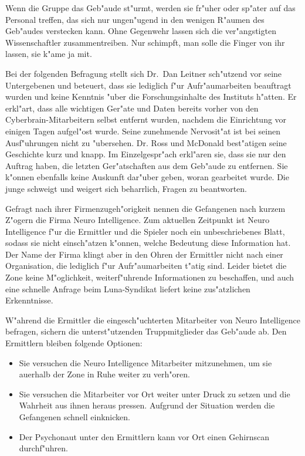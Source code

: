 Wenn die Gruppe das Geb"aude st"urmt, werden sie fr"uher oder sp"ater auf das Personal treffen, das sich nur ungen"ugend in den wenigen R"aumen des Geb"audes verstecken kann. Ohne Gegenwehr lassen sich die ver"angstigten Wissenschaftler zusammentreiben. Nur \ml{} schimpft, man solle die Finger von ihr lassen, sie k"ame ja mit.

Bei der folgenden Befragung stellt sich Dr.~Dan Leitner sch"utzend vor seine Untergebenen und beteuert, dass sie lediglich f"ur Aufr"aumarbeiten beauftragt wurden und keine Kenntnis "uber die Forschungsinhalte des Instituts h"atten. Er erkl"art, dass alle wichtigen Ger"ate und Daten bereits vorher von den Cyberbrain-Mitarbeitern selbst entfernt wurden, nachdem die Einrichtung vor einigen Tagen aufgel"ost wurde. Seine zunehmende Nervosit"at ist bei seinen Ausf"uhrungen nicht zu "ubersehen. Dr. Ross und McDonald best"atigen seine Geschichte kurz und knapp. Im Einzelgespr"ach erkl"aren sie, dass sie nur den Auftrag haben, die letzten Ger"atschaften aus dem Geb"aude zu entfernen. Sie k"onnen ebenfalls keine Auskunft dar"uber geben, woran gearbeitet wurde. Die junge \ml{} schweigt und weigert sich beharrlich, Fragen zu beantworten.

Gefragt nach ihrer Firmenzugeh"origkeit nennen die Gefangenen nach kurzem Z"ogern die Firma Neuro Intelligence. Zum aktuellen Zeitpunkt ist Neuro Intelligence f"ur die Ermittler und die Spieler noch ein unbeschriebenes Blatt, sodass sie nicht einsch"atzen k"onnen, welche Bedeutung diese Information hat. Der Name der Firma klingt aber in den Ohren der Ermittler nicht nach einer Organisation, die lediglich f"ur Aufr"aumarbeiten t"atig sind. Leider bietet die Zone keine M"oglichkeit, weiterf"uhrende Informationen zu beschaffen, und auch eine schnelle Anfrage beim Luna-Syndikat liefert keine zus"atzlichen Erkenntnisse.

W"ahrend die Ermittler die eingesch"uchterten Mitarbeiter von Neuro Intelligence befragen, sichern die unterst"utzenden Truppmitglieder das Geb"aude ab. Den Ermittlern bleiben folgende Optionen:

\begin{itemize}
	\item Sie versuchen die Neuro Intelligence Mitarbeiter mitzunehmen, um sie au\3erhalb der Zone in Ruhe weiter zu verh"oren.
	\item Sie versuchen die Mitarbeiter vor Ort weiter unter Druck zu setzen und die Wahrheit aus ihnen heraus pressen. Aufgrund 
		der Situation werden die Gefangenen schnell einknicken.
	\item Der Psychonaut unter den Ermittlern kann vor Ort einen Gehirnscan durchf"uhren.
\end{itemize}

